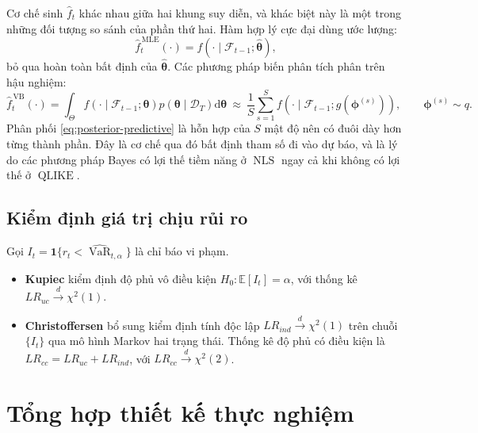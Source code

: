 \documentclass[12pt,a4paper]{article}
\numberwithin{equation}{section}
\theoremstyle{definition}
\newcommand{\E}{\mathbb{E}}
\newcommand{\QLIKE}{\operatorname{QLIKE}}
\newcommand{\NLS}{\operatorname{NLS}}
\newcommand{\VaR}{\operatorname{VaR}}
\newcommand{\Data}{\mathcal{D}}
\newcommand{\Info}{\mathcal{F}}
\newcommand{\Param}{\symbf{\theta}}
\newcommand{\vecphi}{\symbf{\phi}}
\newcommand{\diff}{\mathrm{d}}
\begin{document}
	Cơ chế sinh $\widehat f_t$ khác nhau giữa hai khung suy diễn, và khác biệt này là một
	trong những đối tượng so sánh của phần thứ hai. Hàm hợp lý cực đại dùng ước lượng:
	\begin{equation}
		\widehat f_t^{\,\mathrm{MLE}}(\cdot)=f\!\left(\cdot\mid\Info_{t-1};\hat{\Param}\right),
		\label{eq:plugin-predictive}
	\end{equation}
	bỏ qua hoàn toàn bất định của $\hat{\Param}$. Các phương pháp biến phân tích phân trên
	hậu nghiệm:
	\begin{equation}
		\widehat f_t^{\,\mathrm{VB}}(\cdot)
		=\int_{\Theta}f\!\left(\cdot\mid\Info_{t-1};\Param\right)
		p\!\left(\Param\mid\Data_T\right)\diff\Param
		\ \approx\ \frac{1}{S}\sum_{s=1}^{S}
		f\!\left(\cdot\mid\Info_{t-1};g(\vecphi^{(s)})\right),
		\qquad \vecphi^{(s)}\sim q.
		\label{eq:posterior-predictive}
	\end{equation}
	Phân phối \eqref{eq:posterior-predictive} là hỗn hợp của $S$ mật độ nên có đuôi dày hơn
	từng thành phần. Đây là cơ chế qua đó bất định tham số đi vào dự báo, và là lý do các
	phương pháp Bayes có lợi thế tiềm năng ở $\NLS$ ngay cả khi không có lợi thế ở $\QLIKE$.
	
	\subsection{Kiểm định giá trị chịu rủi ro}\label{subsec:var-tests}
	Gọi $I_t=\symbf 1\{r_t<\widehat{\VaR}_{t,\alpha}\}$ là chỉ báo vi phạm. 
	\begin{itemize}
		\item \textbf{Kupiec} \cite{kupiec1995} kiểm định độ phủ vô điều kiện
		$H_0\!:\E[I_t]=\alpha$, với thống kê $LR_{uc}\overset{d}{\to}\chi^{2}(1)$.
		\item \textbf{Christoffersen} \cite{christoffersen1998} bổ sung kiểm định tính độc lập
		$LR_{ind}\overset{d}{\to}\chi^{2}(1)$ trên chuỗi $\{I_t\}$ qua mô hình Markov hai trạng
		thái. Thống kê độ phủ có điều kiện là $LR_{cc}=LR_{uc}+LR_{ind}$, với
		$LR_{cc}\overset{d}{\to}\chi^{2}(2)$.
	\end{itemize}
	
	\section{Tổng hợp thiết kế thực nghiệm}\label{sec:design-summary}
	
\end{document}
